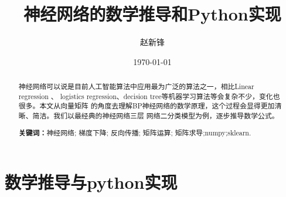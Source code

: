 \documentclass[12pt, a4paper, oneside]{ctexart}
\title{\textbf{神经网络的数学推导和Python实现}}
\author{赵新锋}
\date{\today}
\begin{document}
\maketitle

\setcounter{page}{0}
\maketitle
\thispagestyle{empty}

\begin{abstract}
神经网络可以说是目前人工智能算法中应用最为广泛的算法之一，相比Linear regression 、
logistics regression、decision tree等机器学习算法等会复杂不少，变化也很多。本文从向量矩阵
的角度去理解BP神经网络的数学原理，这个过程会显得更加清晰、简洁。我们以最经典的神经网络三层
网络二分类模型为例，逐步推导数学公式。
\par\textbf{关键词：}神经网络; 梯度下降; 反向传播; 矩阵运算; 矩阵求导;numpy;sklearn. 
\end{abstract}

\newpage
{}
\setcounter{page}{1}
\tableofcontents
\newpage
\setcounter{page}{1}


\newpage
\section{数学推导与python实现}
\end{document}
